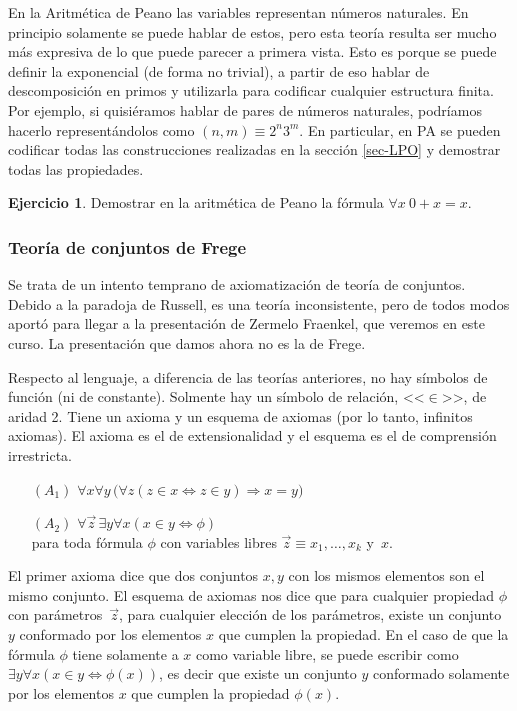\documentclass[a4paper, 12pt]{report}
\newcommand{\Ra}{\Rightarrow}
\newcommand{\Lra}{\Leftrightarrow}
\theoremstyle{definition}
\newtheorem{ejercicio}{Ejercicio}[section]
\begin{document}
En la Aritmética de Peano las variables representan números naturales. En principio solamente se puede hablar de estos, pero esta teoría resulta ser mucho más expresiva de lo que puede parecer a primera vista. Esto es porque se puede definir la exponencial (de forma no trivial), a partir de eso hablar de descomposición en primos y utilizarla para codificar cualquier estructura finita. Por ejemplo, si quisiéramos hablar de pares de números naturales, podríamos hacerlo representándolos como $(n,m)\equiv 2^n3^m$. En particular, en PA se pueden codificar todas las construcciones realizadas en la sección \ref{sec-LPO} y demostrar todas las propiedades.

\begin{ejercicio}
	Demostrar en la aritmética de Peano la fórmula $\forall x~0+x=x$.
\end{ejercicio}

\subsubsection{Teoría de conjuntos de Frege}

Se trata de un intento temprano de axiomatización de teoría de conjuntos. Debido a la paradoja de Russell, es una teoría inconsistente, pero de todos modos aportó para llegar a la presentación de Zermelo Fraenkel, que veremos en este curso. La presentación que damos ahora no es la de Frege.

Respecto al lenguaje, a diferencia de las teorías anteriores, no hay símbolos de función (ni de constante). Solmente hay un símbolo de relación, <<$\in$>>, de aridad 2. Tiene un axioma y un esquema de axiomas (por lo tanto, infinitos axiomas). El axioma es el de extensionalidad y el esquema es el de comprensión irrestricta.
\begin{enumerate}\parskip-.5ex
	\item[$(A_1)$] $\forall x\forall y\,\bigl(\forall z(z\in x\Lra z\in y)\Ra x=y\bigr)$
	\item[$(A_2)$] $\forall\vec{z}\,\exists y\forall x(x\in y\Lra \phi)$\\
	para toda fórmula $\phi$ con variables libres
	$\vec{z}\equiv x_1,\ldots,x_k$ y~$x$.
\end{enumerate}
El primer axioma dice que dos conjuntos $x,y$ con los mismos elementos son el mismo conjunto. El esquema de axiomas nos dice que para cualquier propiedad $\phi$ con parámetros~$\vec{z}$, para cualquier elección de los parámetros, existe un conjunto $y$ conformado por los elementos $x$ que cumplen la propiedad. En el caso de que la fórmula $\phi$ tiene solamente a $x$ como variable libre, se puede escribir como $\exists y\forall x(x\in y\Lra \phi(x))$, es decir que existe un conjunto $y$ conformado solamente por los elementos $x$ que cumplen la propiedad $\phi(x)$.
\end{document}
